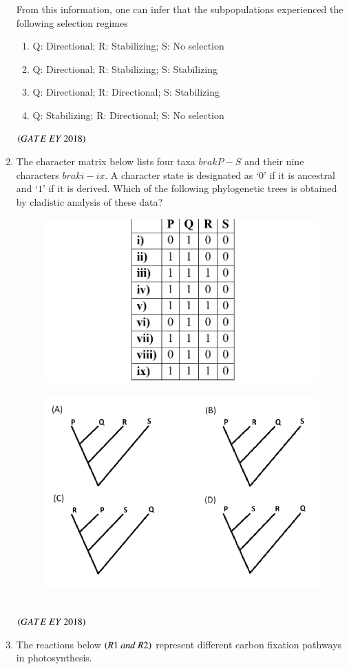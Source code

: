 \documentclass[journal]{IEEEtran}
\numberwithin{equation}{enumi}
\numberwithin{figure}{enumi}
\begin{document}
\begin{enumerate}
\begin{figure}[!ht]
    \caption{}
    \label{fig:6}
   \end{figure}
   From this information, one can infer that the subpopulations experienced the
following selection regimes
\begin{enumerate}
        \item Q: Directional; R: Stabilizing; S: No selection
        \item Q: Directional; R: Stabilizing; S: Stabilizing
        \item Q: Directional; R: Directional; S: Stabilizing
        \item Q: Stabilizing; R: Directional; S: No selection
    \end{enumerate}
    \hfill{$\brak{ GATE\ EY\ 2018}$}
    \bigskip
    \item The character matrix below lists four taxa $brak{P-S}$ and their nine characters $brak{i-ix}$. A
character state is designated as `0' if it is ancestral and `$1$' if it is derived. Which of
the following phylogenetic trees is obtained by cladistic analysis of these data?
    \begin{figure}[!ht]
    \centering
    \includegraphics[width=0.2\columnwidth]{figs/7.png}
    \caption{}
    \label{fig:7}
   \end{figure}
   \begin{figure}[!ht]
    \centering
    \includegraphics[width=0.3\columnwidth]{figs/17.png}
    \caption{}
    \label{fig:17}
   \end{figure}
   \\
    \hfill{$\brak{ GATE\ EY\ 2018}$}
    \bigskip
    
\item The reactions below $\brak{R1\ and\ R2}$ represent different carbon fixation pathways in
photosynthesis.


\end{enumerate}
\end{document}
